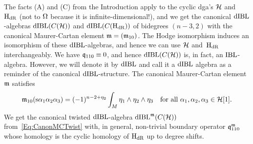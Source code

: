 \documentclass[\MainFolder/Text.tex]{subfiles}
\begin{document}
The facts (A) and (C) from the Introduction apply to the cyclic dga's $\mathcal{H}{}$ and~$\mathrm{H}_{\mathrm{dR}}{}$ (not to $\Omega{}$ because it is infinite-dimensional!), and we get the canonical $\mathrm{dIBL}$-algebras $\mathrm{dIBL}(C(\mathcal{H}))$ and $\mathrm{dIBL}(C(\mathrm{H}_{\mathrm{dR}}))$ of bidegrees $(n-3,2)$ with the canonical Maurer-Cartan element $\mathfrak{m} = (\mathfrak{m}_{10})$. The Hodge isomorphism induces an isomorphism of these $\mathrm{dIBL}$-algebras, and hence we can use $\mathcal{H}$ and~$\mathrm{H}_{\mathrm{dR}}$ interchangeably.
We have $\mathfrak{q}_{110} \equiv 0$, and hence $\mathrm{dIBL}(C(\mathcal{H}))$ is, in fact, an $\mathrm{IBL}$-algebra. However, we will denote it by $\mathrm{dIBL}$ and call it a $\mathrm{dIBL}$ algebra as a reminder of the canonical $\mathrm{dIBL}$-structure. The canonical Maurer-Cartan element~$\mathfrak{m}$ satisfies
\begin{equation}\label{Eq:CanonMC}
\mathfrak{m}_{10}(\mathrm{s} \alpha_1 \alpha_2 \alpha_3) = (-1)^{n-2 + \eta_2} \int_M \eta_1 \wedge \eta_2 \wedge \eta_3 \quad \text{for all } \alpha_1, \alpha_2, \alpha_3 \in \mathcal{H}[1].
\end{equation}
We get the canonical twisted $\mathrm{dIBL}$-algebra $\mathrm{dIBL}^{\mathfrak{m}}(C(\mathcal{H}))$ from~\eqref{Eq:CanonMCTwist} with, in general, non-trivial boundary operator $\mathfrak{q}_{110}^{\mathfrak{m}}$ whose homology is the cyclic homology of $\mathrm{H}_{\mathrm{dR}}$ up to degree shifts.
%
\end{document}
